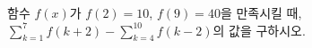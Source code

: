 함수 $f(x)$가 $f(2)=10$, $f(9)=40$을 만족시킬 때, $\displaystyle\sum_{k=1}^{7} f(k+2)-\sum_{k=4}^{10} f(k-2)$의 값을 구하시오.
